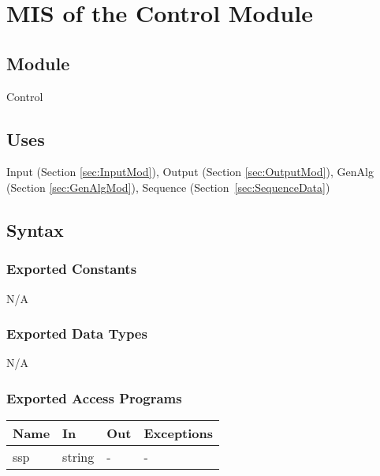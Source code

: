 \documentclass[12pt, titlepage]{article}
\begin{document}

\clearpage
\newpage
\section{MIS of the Control Module}

\subsection{Module}
Control

\subsection{Uses}

Input (Section \ref{sec:InputMod}), Output (Section \ref{sec:OutputMod}), 
GenAlg (Section \ref{sec:GenAlgMod}), Sequence (Section~\ref{sec:SequenceData})

\subsection{Syntax}

\subsubsection{Exported Constants}
N/A

\subsubsection{Exported Data Types}
N/A

\subsubsection{Exported Access Programs}

\begin{center}
\renewcommand*{\arraystretch}{1.5}
\begin{tabular} {p{}  p{}  p{} 
p{} } \hline 
\textbf{Name} & \textbf{In} & \textbf{Out} & \textbf{Exceptions} \\ \hline

  ssp & string & - & - \\ \hline
\end{tabular}
\end{center}
\end{document}
